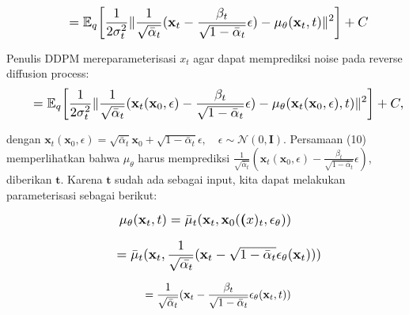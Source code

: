 \documentclass{article}
\newcommand*{\Scale}[2][4]{\scalebox{#1}{\ensuremath{#2}}}
\begin{document}
\begin{equation}
\Scale[1.2]{ \displaystyle
\hspace{2em} = \mathbb{E}_{q} \left[ 
\frac{1}{2\sigma_t^2}
\norm{
\frac{1}{\sqrt{\bar{\alpha}_t}}(\textbf{x}_t - \frac{\beta_t}{\sqrt{1-\bar{\alpha}_t}} \epsilon)
-
\mu_\theta(\textbf{x}_{t},t)
}^2
\right] + C 
}
\end{equation}

Penulis DDPM mereparameterisasi $ x_t $ agar dapat memprediksi noise pada reverse diffusion process:
\begin{equation}
\Scale[1.2]{ \displaystyle
\hspace{2em} = \mathbb{E}_{q} \left[ 
\frac{1}{2\sigma_t^2}
\norm{
\frac{1}{\sqrt{\bar{\alpha}_t}} ( \textbf{x}_t(\textbf{x}_0,\epsilon ) - \frac{\beta_t}{\sqrt{1-\bar{\alpha}_t}} \epsilon)
-
\mu_\theta(\textbf{x}_t(\textbf{x}_0,\epsilon),t)
}^2
\right] + C, }
\end{equation}

dengan $ \textbf{x}_t(\textbf{x}_0,\epsilon) = \sqrt{\bar{\alpha}_t}\textbf{x}_0 + \sqrt{1-\bar{\alpha}_t}\epsilon, \hspace{1em} \epsilon \sim\mathscr{N}(0,\textbf{I}). $
Persamaan (10) memperlihatkan bahwa $ \mu_\theta $ harus memprediksi $ \frac{1}{\sqrt{\bar{\alpha}_t}} ( \textbf{x}_t(\textbf{x}_0,\epsilon ) - \frac{\beta_t}{\sqrt{1-\bar{\alpha}_t}} \epsilon) $, diberikan $ \textbf{t} $. Karena $ \textbf{t} $ sudah ada sebagai input, kita dapat melakukan parameterisasi sebagai berikut:

\begin{equation}
\Scale[1.2]{ \displaystyle
\mu_\theta(\textbf{x}_{t},t) = \bar{\mu}_t(\textbf{x}_{t}, \textbf{x}_0(\textbf(x)_t, \epsilon_\theta)) }
\end{equation}

\begin{equation}
\Scale[1.2]{ \displaystyle
\hspace{2em} = \bar{\mu}_t(\textbf{x}_{t}, \frac{1}{\sqrt{\bar{\alpha_t}}}(\textbf{x}_{t} - \sqrt{1-\bar{\alpha}_t} \epsilon_\theta(\textbf{x}_t))) }
\end{equation}

\begin{fleqn}[\parindent]
\begin{equation}
\begin{split}
\hspace{2.25em} = \frac{1}{\sqrt{\bar{\alpha}_t}} ( \textbf{x}_t - \frac{\beta_t}{\sqrt{1-\bar{\alpha}_t}} \epsilon_\theta(\textbf{x}_t, t))
\end{split}
\end{equation}
\end{fleqn}
\end{document}
